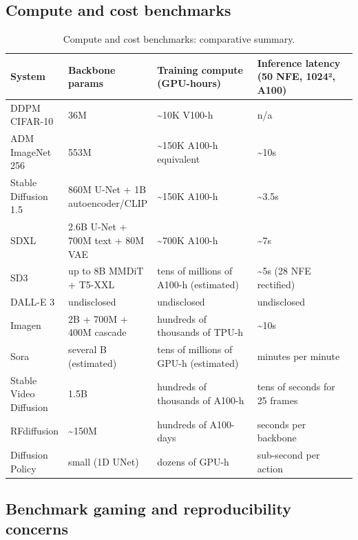 \documentclass{article}
\begin{document}
\subsection{Compute and cost benchmarks}\label{compute-and-cost-benchmarks}

\begin{table}[t]
\centering
\caption{Compute and cost benchmarks: comparative summary.}
\label{tab:compute-and-cost-benchmarks}
\begin{tabular}{>{\raggedright\arraybackslash}p{0.1679\linewidth}
  >{\raggedright\arraybackslash}p{0.2443\linewidth}
  >{\raggedright\arraybackslash}p{0.2901\linewidth}
  >{\raggedright\arraybackslash}p{0.2977\linewidth}}
\toprule
System & Backbone params & Training compute (GPU-hours) & Inference latency (50 NFE, 1024², A100) \\
\midrule
DDPM CIFAR-10 & 36M & \textasciitilde10K V100-h & n/a \\
ADM ImageNet 256 & 553M & \textasciitilde150K A100-h equivalent & \textasciitilde10s \\
Stable Diffusion 1.5 & 860M U-Net + 1B autoencoder/CLIP & \textasciitilde150K A100-h & \textasciitilde3.5s \\
SDXL & 2.6B U-Net + 700M text + 80M VAE & \textasciitilde700K A100-h & \textasciitilde7s \\
SD3 & up to 8B MMDiT + T5-XXL & tens of millions of A100-h (estimated) & \textasciitilde5s (28 NFE rectified) \\
DALL-E 3 & undisclosed & undisclosed & undisclosed \\
Imagen & 2B + 700M + 400M cascade & hundreds of thousands of TPU-h & \textasciitilde10s \\
Sora & several B (estimated) & tens of millions of GPU-h (estimated) & minutes per minute \\
Stable Video Diffusion & 1.5B & hundreds of thousands of A100-h & tens of seconds for 25 frames \\
RFdiffusion & \textasciitilde150M & hundreds of A100-days & seconds per backbone \\
Diffusion Policy & small (1D UNet) & dozens of GPU-h & sub-second per action \\
\end{tabular}
\end{table}

\subsection{Benchmark gaming and reproducibility concerns}\label{benchmark-gaming-and-reproducibility-concerns}
\end{document}
